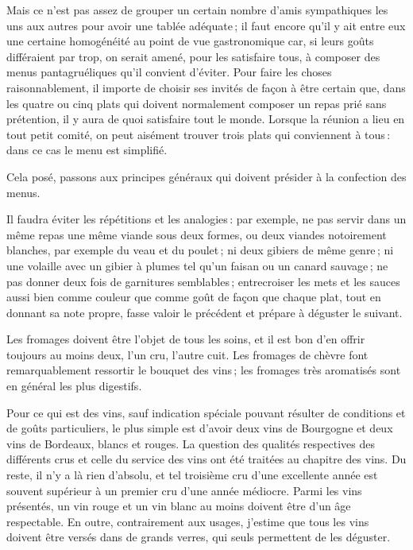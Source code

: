Mais ce n'est pas assez de grouper un certain nombre d'amis sympathiques les
uns aux autres pour avoir une tablée adéquate ; il faut encore qu'il y ait
entre eux une certaine homogénéité au point de vue gastronomique car, si leurs
goûts différaient par trop, on serait amené, pour les satisfaire tous,
à composer des menus pantagruéliques qu'il convient d'éviter. Pour faire les
choses raisonnablement, il importe de choisir ses invités de façon à être
certain que, dans les quatre ou cinq plats qui doivent normalement composer un
repas prié sans prétention, il y aura de quoi satisfaire tout le monde. Lorsque
la réunion a lieu en tout petit comité, on peut aisément trouver trois plats
qui conviennent à tous : dans ce cas le menu est simplifié.

Cela posé, passons aux principes généraux qui doivent présider à la confection
des menus.

Il faudra éviter les répétitions et les analogies : par exemple, ne pas servir
dans un même repas une même viande sous deux formes, ou deux viandes
notoirement blanches, par exemple du veau et du poulet ; ni deux gibiers de
même genre ; ni une volaille avec un gibier à plumes tel qu'un faisan ou un
canard sauvage ; ne pas donner deux fois de garnitures semblables ;
entrecroiser les mets et les sauces aussi bien comme couleur que comme goût de
façon que chaque plat, tout en donnant sa note propre, fasse valoir le
précédent et prépare à déguster le suivant.

Les fromages doivent être l'objet de tous les soins, et il est bon d'en offrir
toujours au moins deux, l'un cru, l'autre cuit. Les fromages de chèvre font
remarquablement ressortir le bouquet des vins ; les fromages très aromatisés
sont en général les plus digestifs.

Pour ce qui est des vins, sauf indication spéciale pouvant résulter de
conditions et de goûts particuliers, le plus simple est d'avoir deux vins de
Bourgogne et deux vins de Bordeaux, blancs et rouges. La question des qualités
respectives des différents crus et celle du service des vins ont été traitées
au chapitre des vins. Du reste, il n'y a là rien d'absolu, et tel troisième cru
d’une excellente année est souvent supérieur à un premier cru d'une année
médiocre. Parmi les vins présentés, un vin rouge et un vin blanc au moins
doivent être d'un âge respectable. En outre, contrairement aux usages, j'estime
que tous les vins doivent être versés dans de grands verres, qui seuls
permettent de les déguster.

